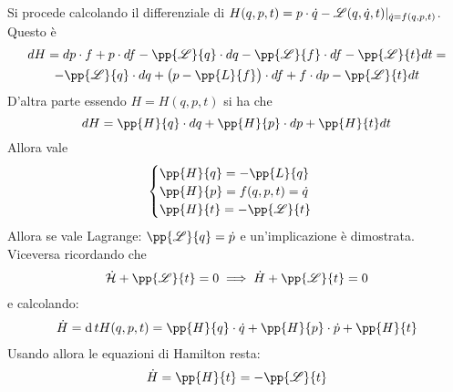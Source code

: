 \documentclass[Main.tex]{subfiles}
\begin{document}
\begin{dm}
    Si procede calcolando il differenziale di $H(q,p,t) = p \cdot \dot q - \mathscr{L}(q,\dot q, t) \rvert_{\dot q = f(q,p,t)}$. Questo è
    \begin{gather}
        dH = dp \cdot f + p \cdot df - \pp{\L}{q} \cdot dq - \pp{\L}{f} \cdot df - \pp{\L}{t} dt = \\ -\pp {\L}{q} \cdot dq + \big( p - \pp{L}{f} \big)\cdot df + f \cdot dp - \pp{\L}{t}dt
    \end{gather}
    D'altra parte essendo $H = H(q,p,t)$ si ha che
    \begin{equation}
        dH = \pp{H}{q}\cdot dq + \pp{H}{p}\cdot dp + \pp{H}{t}dt
    \end{equation}
    Allora vale
    \begin{equation}
        \begin{cases}
            \pp{H}{q} = - \pp{L}{q}\\
            \pp{H}{p} = f(q,p,t) = \dot q\\ 
            \pp{H}{t} = -\pp{\L}{t}
        \end{cases}
    \end{equation}
    Allora se vale Lagrange: $\pp{\L}{q} = \dot p$ e un'implicazione è dimostrata. Viceversa ricordando che 
    \begin{gather}
        \dot{\mathcal{H}} + \pp{\L}{t} = 0 \implies \dot H + \pp{\L}{t} = 0
    \end{gather}
    e calcolando:
    \begin{gather}
        \dot H = \dd{}{t} H(q,p,t) = \pp{H}{q} \cdot \dot q + \pp{H}{p} \cdot \dot p + \pp{H}{t}
    \end{gather}
    Usando allora le equazioni di Hamilton resta: $$\dot H = \pp{H}{t} = -\pp{\L}{t}$$ 
\end{dm}
\end{document}
